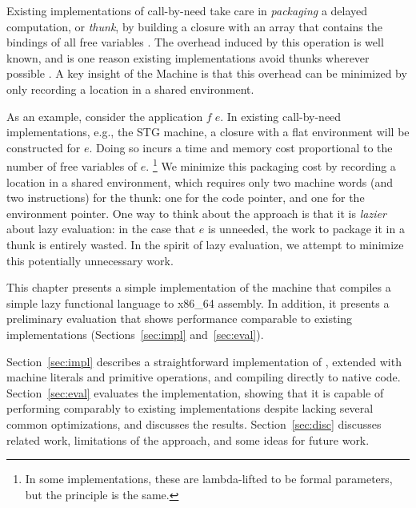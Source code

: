 Existing implementations of call-by-need take care in \emph{packaging} a delayed
computation, or \emph{thunk}, by building a closure with an array that contains
the bindings of all free variables \cite{jonesstg,boquist1997grin}. The overhead
induced by this operation is well known, and is one reason existing
implementations avoid thunks wherever possible \cite{johnsson1984efficient}. A
key insight of the \ce Machine is that this overhead can be minimized by only
recording a location in a shared environment.

As an example, consider the application $f \; e$. In existing call-by-need
implementations, e.g., the STG machine\cite{jonesstg}, a closure with a flat
environment will be constructed for $e$.  Doing so incurs a time and memory cost
proportional to the number of free variables of $e$. \footnote{In some
implementations, these are lambda-lifted to be formal parameters, but the
principle is the same.} We minimize this packaging cost by recording a
location in a shared environment, which requires only two
machine words (and two instructions) for the thunk: one for the code pointer,
and one for the environment pointer. One way to think about the approach is that
it is \emph{lazier} about lazy evaluation: in the case that $e$ is unneeded, the
work to package it in a thunk is entirely wasted. In the spirit of lazy
evaluation, we attempt to minimize this potentially unnecessary work.  

This chapter presents a simple implementation of the \ce machine that
compiles a simple lazy functional language to x86\_64 assembly. In addition, it
presents a preliminary evaluation that shows performance comparable to existing
implementations (Sections~\ref{sec:impl} and~\ref{sec:eval}). 

Section~\ref{sec:impl} describes a straightforward implementation of \ce,
extended with machine literals and primitive operations, and compiling directly
to native code. Section~\ref{sec:eval} evaluates the implementation, showing
that it is capable of performing comparably to existing implementations despite
lacking several common optimizations, and discusses the results.
Section~\ref{sec:disc} discusses related work, limitations of the approach, and
some ideas for future work.
